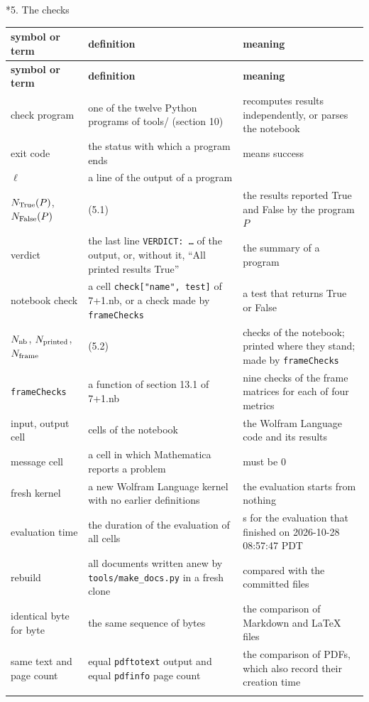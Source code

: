 \documentclass[10pt,a4paper]{article}
\makeatletter
\renewcommand\section{\@startsection{section}{1}{\z@}{-3.5ex \@plus -1ex \@minus -.2ex}{2.3ex \@plus.2ex}{\normalfont\Large\bfseries\raggedright}}
\makeatother
\begin{document}
\section*{5. The checks}
{\footnotesize
\begin{longtable}{>{\raggedright\arraybackslash}p{}>{\raggedright\arraybackslash}p{}>{\raggedright\arraybackslash}p{}}
\toprule
\textbf{symbol or term} & \textbf{definition} & \textbf{meaning} \\
\midrule\endfirsthead
\toprule
\textbf{symbol or term} & \textbf{definition} & \textbf{meaning} \\
\midrule\endhead
\endfoot
\bottomrule\endlastfoot
check program & one of the twelve Python programs of tools/ (section 10) & recomputes results independently, or parses the notebook \\
exit code & the status with which a program ends & 0 means success \\
$\ell$ & a line of the output of a program &  \\
$N_{\rm True}(P)$, $N_{\rm False}(P)$ & (5.1) & the results reported True and False by the program $P$ \\
verdict & the last line \texttt{VERDICT: …} of the output, or, without it, “All printed results True” & the summary of a program \\
notebook check & a cell \texttt{check["name", test]} of 7+1.nb, or a check made by \texttt{frameChecks} & a test that returns True or False \\
$N_{\rm nb}$, $N_{\rm printed}$, $N_{\rm frame}$ & (5.2) & checks of the notebook; printed where they stand; made by \texttt{frameChecks} \\
\texttt{frameChecks} & a function of section 13.1 of 7+1.nb & nine checks of the frame matrices for each of four metrics \\
input, output cell & cells of the notebook & the Wolfram Language code and its results \\
message cell & a cell in which Mathematica reports a problem & must be 0 \\
fresh kernel & a new Wolfram Language kernel with no earlier definitions & the evaluation starts from nothing \\
evaluation time & the duration of the evaluation of all cells & 283.883 s for the evaluation that finished on 2026-10-28 08:57:47 PDT \\
rebuild & all documents written anew by \texttt{tools/\allowbreak{}make\_\allowbreak{}docs.py} in a fresh clone & compared with the committed files \\
identical byte for byte & the same sequence of bytes & the comparison of Markdown and LaTeX files \\
same text and page count & equal \texttt{pdftotext} output and equal \texttt{pdfinfo} page count & the comparison of PDFs, which also record their creation time \\*
\end{longtable}}
\end{document}
